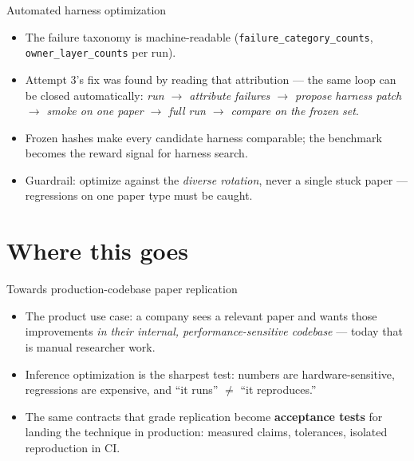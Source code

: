\documentclass[aspectratio=169]{beamer}
\begin{document}
\begin{frame}{Automated harness optimization}
  \begin{itemize}
    \item The failure taxonomy is machine-readable
          (\texttt{failure\_category\_counts}, \texttt{owner\_layer\_counts} per run).
    \item Attempt 3's fix was found by reading that attribution --- the same loop can
          be closed automatically:
          \emph{run $\rightarrow$ attribute failures $\rightarrow$ propose harness patch
          $\rightarrow$ smoke on one paper $\rightarrow$ full run $\rightarrow$ compare on
          the frozen set}.
    \item Frozen hashes make every candidate harness comparable; the benchmark becomes
          the reward signal for harness search.
    \item Guardrail: optimize against the \emph{diverse rotation}, never a single stuck
          paper --- regressions on one paper type must be caught.
  \end{itemize}
\end{frame}

\section{Where this goes}

\begin{frame}{Towards production-codebase paper replication}
  \begin{itemize}
    \item The product use case: a company sees a relevant paper and wants those
          improvements \emph{in their internal, performance-sensitive codebase} ---
          today that is manual researcher work.
    \item Inference optimization is the sharpest test: numbers are hardware-sensitive,
          regressions are expensive, and ``it runs'' $\neq$ ``it reproduces.''
    \item The same contracts that grade replication become \textbf{acceptance tests}
          for landing the technique in production: measured claims, tolerances,
          isolated reproduction in CI.
  \end{itemize}
\end{frame}
\end{document}

